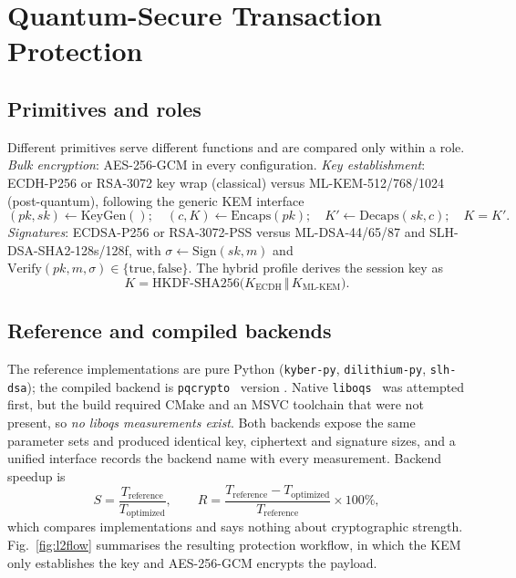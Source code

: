 \section{Quantum-Secure Transaction Protection}\label{sec:security}
\subsection{Primitives and roles}
Different primitives serve different functions and are compared only within a role. \emph{Bulk encryption}: AES-256-GCM in every configuration. \emph{Key establishment}: ECDH-P256 or RSA-3072 key wrap (classical) versus ML-KEM-512/768/1024 (post-quantum), following the generic KEM interface
\begin{equation}
(pk,sk)\leftarrow\mathrm{KeyGen}();\quad (c,K)\leftarrow\mathrm{Encaps}(pk);\quad K'\leftarrow\mathrm{Decaps}(sk,c);\quad K=K'.
\label{eq:kem}
\end{equation}
\emph{Signatures}: ECDSA-P256 or RSA-3072-PSS versus ML-DSA-44/65/87 and SLH-DSA-SHA2-128s/128f, with $\sigma\leftarrow\mathrm{Sign}(sk,m)$ and $\mathrm{Verify}(pk,m,\sigma)\in\{\text{true},\text{false}\}$. The hybrid profile derives the session key as
\begin{equation}
K=\mathrm{HKDF\text{-}SHA256}\bigl(K_{\mathrm{ECDH}}\,\Vert\,K_{\mathrm{ML\text{-}KEM}}\bigr).
\label{eq:hybrid}
\end{equation}

\subsection{Reference and compiled backends}
The reference implementations are pure Python (\texttt{kyber-py}, \texttt{dilithium-py}, \texttt{slh-dsa}); the compiled backend is \texttt{pqcrypto}~\cite{pqcrypto} version \PqcryptoVersion{}. Native \texttt{liboqs}~\cite{liboqs} was attempted first, but the build required CMake and an MSVC toolchain that were not present, so \emph{no liboqs measurements exist}. Both backends expose the same parameter sets and produced identical key, ciphertext and signature sizes, and a unified interface records the backend name with every measurement. Backend speedup is
\begin{equation}
S=\frac{T_{\mathrm{reference}}}{T_{\mathrm{optimized}}},\qquad
R=\frac{T_{\mathrm{reference}}-T_{\mathrm{optimized}}}{T_{\mathrm{reference}}}\times100\%,
\label{eq:speedup}
\end{equation}
which compares implementations and says nothing about cryptographic strength. Fig.~\ref{fig:l2flow} summarises the resulting protection workflow, in which the KEM only establishes the key and AES-256-GCM encrypts the payload.

